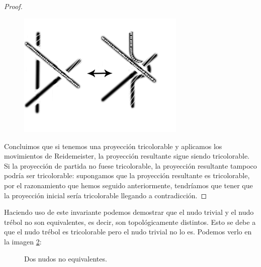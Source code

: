 \documentclass[14pt]{extarticle}
\begin{document}
\begin{teo}
\begin{proof}
\begin{figure}[h!]
			\includegraphics[width=8cm]{inudos/movi5tri4.png}
			\caption{}
			\label{demotri4} 
		\end{figure}
		
	Concluimos que si tenemos una proyección tricolorable y aplicamos los movimientos de Reidemeister, la proyección resultante sigue siendo tricolorable. \\
	Si la proyección de partida no fuese tricolorable, la proyección resultante tampoco podría ser tricolorable: supongamos que la proyección resultante es tricolorable, por el razonamiento que hemos seguido anteriormente, tendríamos que tener que la proyección inicial sería tricolorable llegando a contradicción. 
		
\end{proof}
\end{teo}


Haciendo uso de este invariante podemos demostrar que el nudo trivial y el nudo trébol no son equivalentes, es decir, son topológicamente distintos. Esto se debe a que el nudo trébol es tricolorable pero el nudo trivial no lo es. Podemos verlo en la imagen \ref{Tric2}:\\
   \begin{figure}[h!]
   	\centering
   	\caption{Dos nudos no equivalentes.}
   	\label{Tric2} 
   \end{figure} 
\end{document}

